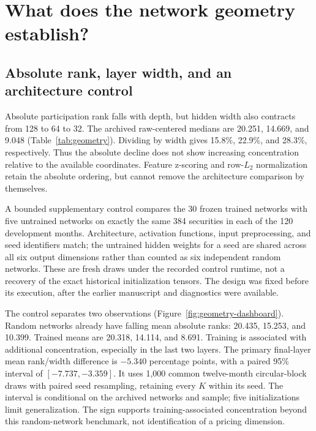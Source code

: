 \section{What does the network geometry establish?}
\label{sec:geometry}

\subsection{Absolute rank, layer width, and an architecture control}

Absolute participation rank falls with depth, but hidden width also contracts from 128 to 64 to 32. The archived raw-centered medians are 20.251, 14.669, and 9.048 (Table~\ref{tab:geometry}). Dividing by width gives 15.8\%, 22.9\%, and 28.3\%, respectively. Thus the absolute decline does not show increasing concentration relative to the available coordinates. Feature z-scoring and row-$L_2$ normalization retain the absolute ordering, but cannot remove the architecture comparison by themselves.

A bounded supplementary control compares the 30 frozen trained networks with five untrained networks on exactly the same 384 securities in each of the 120 development months. Architecture, activation functions, input preprocessing, and seed identifiers match; the untrained hidden weights for a seed are shared across all six output dimensions rather than counted as six independent random networks. These are fresh draws under the recorded control runtime, not a recovery of the exact historical initialization tensors. The design was fixed before its execution, after the earlier manuscript and diagnostics were available.

The control separates two observations (Figure~\ref{fig:geometry-dashboard}). Random networks already have falling mean absolute ranks: 20.435, 15.253, and 10.399. Trained means are 20.318, 14.114, and 8.691. Training is associated with additional concentration, especially in the last two layers. The primary final-layer mean rank/width difference is $-5.340$ percentage points, with a paired 95\% interval of $[-7.737,-3.359]$. It uses 1,000 common twelve-month circular-block draws with paired seed resampling, retaining every $K$ within its seed. The interval is conditional on the archived networks and sample; five initializations limit generalization. The sign supports training-associated concentration beyond this random-network benchmark, not identification of a pricing dimension.



